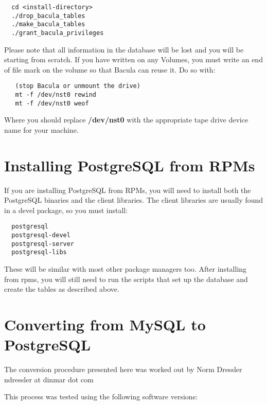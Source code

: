 \footnotesize
\begin{verbatim}
  cd <install-directory>
  ./drop_bacula_tables
  ./make_bacula_tables
  ./grant_bacula_privileges
\end{verbatim}
\normalsize

Please note that all information in the database will be lost and you will be
starting from scratch. If you have written on any Volumes, you must write an
end of file mark on the volume so that Bacula can reuse it. Do so with: 

\footnotesize
\begin{verbatim}
   (stop Bacula or unmount the drive)
   mt -f /dev/nst0 rewind
   mt -f /dev/nst0 weof
\end{verbatim}
\normalsize

Where you should replace {\bf /dev/nst0} with the appropriate tape drive
device name for your machine. 

\section{Installing PostgreSQL from RPMs}
If you are installing PostgreSQL from RPMs, you will need to install
both the PostgreSQL binaries and the client libraries.  The client
libraries are usually found in a devel package, so you must
install:

\footnotesize
\begin{verbatim}
  postgresql
  postgresql-devel
  postgresql-server
  postgresql-libs
\end{verbatim}
\normalsize

These will be similar with most other package managers too.  After
installing from rpms, you will still need to run the scripts that set up
the database and create the tables as described above.


\section{Converting from MySQL to PostgreSQL}

The conversion procedure presented here was worked out by Norm Dressler
\lt{}ndressler at dinmar dot com\gt{} 

This process was tested using the following software versions: 

